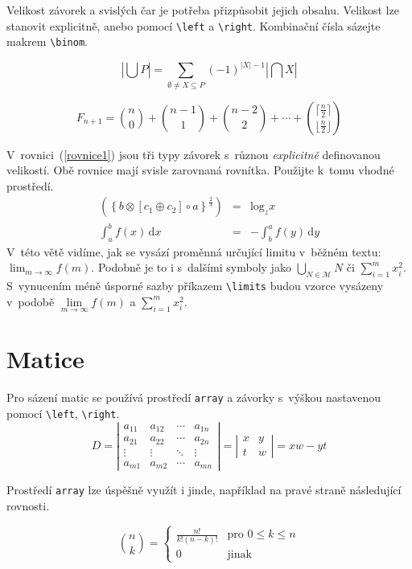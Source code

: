 \documentclass[a4paper, twocolumn, 11pt]{article}
\begin{document}
Velikost závorek a svislých čar je potřeba přizpůsobit jejich obsahu. Velikost lze stanovit explicitně, anebo pomocí \verb|\left| a \verb|\right|. Kombinační čísla sázejte makrem \verb|\binom|.

\begin{equation*}
    \left|\bigcup P\right|=\sum\limits _{\emptyset\neq X\subseteq P}(-1)^{|X|-1}\left|\bigcap X\right|
\end{equation*}

\begin{equation*}
    F_{n+1}=\binom{n}{0}+\binom{n-1}{1}+\binom{n-2}{2}+\cdots+\binom{\lceil\frac{n}{2}\rceil}{\lfloor\frac{n}{2}\rfloor}
\end{equation*}

V~rovnici~(\ref{rovnice1}) jsou tři typy závorek s~různou \emph{explicitně} definovanou velikostí. Obě rovnice mají svisle zarovnaná rovnítka. Použijte k~tomu vhodné prostředí.
\begin{eqnarray}
    \label{rovnice1}\left(\left\{b\otimes[c_1\oplus c_2]\circ a\right\}^{\frac{2}{3}}\right) & = & \mathrm{log}_z x\\
    \label{rovnice2}\int_a^b f(x)\,\mathrm{d}x & = & -\int_b^a f(y)\,\mathrm{d}y
\end{eqnarray}
V~této větě vidíme, jak se vysází proměnná určující limitu v~běžném textu: $\lim_{m\rightarrow\infty} f(m)$. Podobně je to i s~dalšími symboly jako $\bigcup_{N \in \mathcal{M}}N$ či $\sum_{i=1}^m x_i^2$. S~vynucením méně úsporné sazby příkazem \verb|\limits| budou vzorce vysázeny v~podobě $\lim\limits _{m\rightarrow\infty}f(m)$ a $\sum\limits _{i=1}^m x_i^2$.

\section{Matice}

Pro sázení matic se používá prostředí \texttt{array} a závorky s~výškou nastavenou pomocí \verb|\left|, \verb|\right|.
$$D=
\left|
\begin{array}{cccc}
    a_{11} & a_{12} & \cdots & a_{1n}\\
    a_{21} & a_{22} & \cdots & a_{2n}\\
    \vdots & \vdots & \ddots & \vdots\\
    a_{m1} & a_{m2} & \cdots & a_{mn}
\end{array}
\right|
=
\left|
\begin{array}{cc}
    x & y\\
    t & w
\end{array}
\right|
=xw-yt$$

Prostředí \texttt{array} lze úspěšně využít i jinde, například na pravé straně následující rovnosti.

$$\binom{n}{k}=
\left\{
\begin{array}{ll}
    \frac{n!}{k!(n-k)!} & \text{pro } 0\leq k\leq n\\
    0 & \text{jinak}
\end{array}
\right.$$
\end{document}
